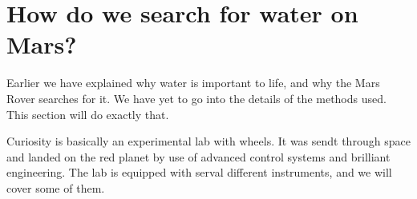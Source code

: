 \section*{How do we search for water on Mars?}
Earlier we have explained why water is important to life, and why the Mars Rover searches for it.
We have yet to go into the details of the methods used.
This section will do exactly that.


Curiosity is basically an experimental lab with wheels.
It was sendt through space and landed on the red planet by use of advanced control systems and brilliant engineering.
The lab is equipped with serval different instruments, and we will cover some of them.
